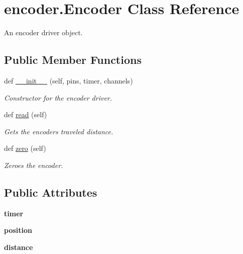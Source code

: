 \hypertarget{classencoder_1_1_encoder}{}\section{encoder.\+Encoder Class Reference}
\label{classencoder_1_1_encoder}


An encoder driver object.  


\subsection*{Public Member Functions}
\begin{DoxyCompactItemize}
\item 
def \mbox{\hyperlink{classencoder_1_1_encoder_a34939827412badc93f8744540676e833}{\+\_\+\+\_\+init\+\_\+\+\_\+}} (self, pins, timer, channels)
\begin{DoxyCompactList}\small\item\em Constructor for the encoder driver. \end{DoxyCompactList}\item 
def \mbox{\hyperlink{classencoder_1_1_encoder_aa1c1535160682500f5214f45d8197027}{read}} (self)
\begin{DoxyCompactList}\small\item\em Gets the encoder\textquotesingle{}s traveled distance. \end{DoxyCompactList}\item 
def \mbox{\hyperlink{classencoder_1_1_encoder_ae238ecdbcbce8a193c2e0ffbb4d1dd29}{zero}} (self)
\begin{DoxyCompactList}\small\item\em Zeroes the encoder. \end{DoxyCompactList}\end{DoxyCompactItemize}
\subsection*{Public Attributes}
\begin{DoxyCompactItemize}
\item 
\mbox{\label{classencoder_1_1_encoder_a8e9c3e1317abc4f6fbe95468c69223d1}} 
{\bfseries timer}
\item 
\mbox{\label{classencoder_1_1_encoder_a9c15eb087b5869c188cf94e53ea3b4f5}} 
{\bfseries position}
\item 
\mbox{\label{classencoder_1_1_encoder_ac16be7b70ef28d19b75108d422f82e28}} 
{\bfseries distance}
\end{DoxyCompactItemize}


